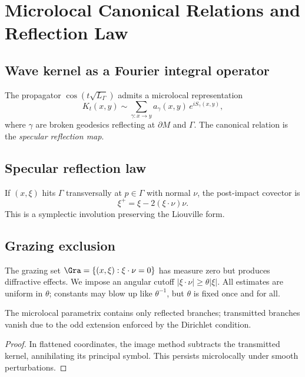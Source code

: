 \section{Microlocal Canonical Relations and Reflection Law}
\label{sec:microlocal}

\subsection{Wave kernel as a Fourier integral operator}
The propagator $\cos(t\sqrt{L_\Gamma})$ admits a microlocal representation
\[
K_t(x,y)\sim\sum_{\gamma:x\to y}a_\gamma(x,y)\,e^{iS_\gamma(x,y)},
\]
where $\gamma$ are broken geodesics reflecting at $\partial M$ and $\Gamma$. The canonical relation is the \emph{specular reflection map}.

\subsection{Specular reflection law}
If $(x,\xi)$ hits $\Gamma$ transversally at $p\in\Gamma$ with normal $\nu$, the post-impact covector is
\[
\xi^+ = \xi-2(\xi\cdot\nu)\nu.
\]
This is a symplectic involution preserving the Liouville form.

\subsection{Grazing exclusion}
The grazing set $\Gra=\{(x,\xi):\xi\cdot\nu=0\}$ has measure zero but produces diffractive effects. We impose an angular cutoff $|\xi\cdot\nu|\ge\theta|\xi|$. All estimates are uniform in $\theta$; constants may blow up like $\theta^{-1}$, but $\theta$ is fixed once and for all.

\begin{proposition}\label{prop:no-transmission}
The microlocal parametrix contains only reflected branches; transmitted branches vanish due to the odd extension enforced by the Dirichlet condition.
\end{proposition}

\begin{proof}
In flattened coordinates, the image method subtracts the transmitted kernel, annihilating its principal symbol. This persists microlocally under smooth perturbations.
\end{proof}

